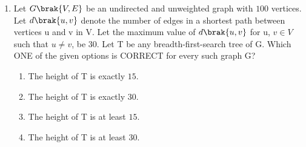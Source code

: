 \documentclass[a4paper, 11pt]{article}
\begin{document}
\begin{enumerate}
    \hfill{}

    \item Let $G\brak{V,E}$ be an undirected and unweighted graph with $100$ vertices. Let $d\brak{u,v}$ denote the number of edges in a shortest path between vertices u and v in V. Let the maximum value of $d\brak{u,v}$ for u, $v \in V$ such that $u \ne v$, be $30$. Let T be any breadth-first-search tree of G. Which ONE of the given options is CORRECT for every such graph G?
    \begin{enumerate}
        \item The height of T is exactly $15$.
        \item The height of T is exactly $30$.
        \item The height of T is at least $15$.
        \item The height of T is at least $30$.
    \end{enumerate}

    \hfill{}


\end{enumerate}
\end{document}
